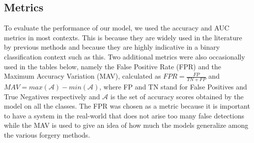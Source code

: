 \documentclass[10pt,twocolumn,letterpaper]{article}
\begin{document}
\subsection{Metrics}
To evaluate the performance of our model, we used the accuracy and AUC metrics in most contexts. This is because they are widely used in the literature by previous methods and because they are highly indicative in a binary classification context such as this. Two additional metrics were also occasionally used in the tables below, namely the False Positive Rate (FPR) and the Maximum Accuracy Variation (MAV), calculated as $FPR = \frac{FP}{TN+FP}$ and $MAV = max(\mathcal{A}) - min(\mathcal{A})$, where FP and TN stand for False Positives and True Negatives respectively and $\mathcal{A}$ is the set of accuracy scores obtained by the model on all the classes. The FPR was chosen as a metric because it is important to have a system in the real-world that does not arise too many false detections while the MAV is used to give an idea of how much the models generalize among the various forgery methods.
\end{document}
